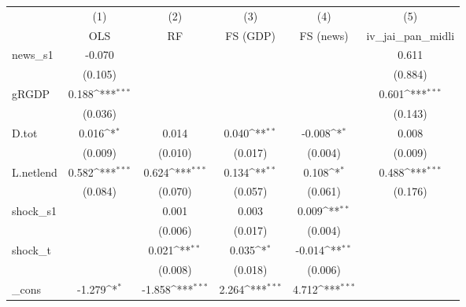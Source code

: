 {
\def\sym#1{\ifmmode^{#1}\else\(^{#1}\)\fi}
\begin{tabular}{l*{5}{c}}
\toprule
            &\multicolumn{1}{c}{(1)}&\multicolumn{1}{c}{(2)}&\multicolumn{1}{c}{(3)}&\multicolumn{1}{c}{(4)}&\multicolumn{1}{c}{(5)}\\
            &\multicolumn{1}{c}{OLS}&\multicolumn{1}{c}{RF}&\multicolumn{1}{c}{FS (GDP)}&\multicolumn{1}{c}{FS (news)}&\multicolumn{1}{c}{iv\_jai\_pan\_midli}\\
\midrule
news\_s1     &      -0.070         &                     &                     &                     &       0.611         \\
            &     (0.105)         &                     &                     &                     &     (0.884)         \\
\addlinespace
gRGDP       &       0.188\sym{***}&                     &                     &                     &       0.601\sym{***}\\
            &     (0.036)         &                     &                     &                     &     (0.143)         \\
\addlinespace
D.tot       &       0.016\sym{*}  &       0.014         &       0.040\sym{**} &      -0.008\sym{*}  &       0.008         \\
            &     (0.009)         &     (0.010)         &     (0.017)         &     (0.004)         &     (0.009)         \\
\addlinespace
L.netlend   &       0.582\sym{***}&       0.624\sym{***}&       0.134\sym{**} &       0.108\sym{*}  &       0.488\sym{***}\\
            &     (0.084)         &     (0.070)         &     (0.057)         &     (0.061)         &     (0.176)         \\
\addlinespace
shock\_s1    &                     &       0.001         &       0.003         &       0.009\sym{**} &                     \\
            &                     &     (0.006)         &     (0.017)         &     (0.004)         &                     \\
\addlinespace
shock\_t     &                     &       0.021\sym{**} &       0.035\sym{*}  &      -0.014\sym{**} &                     \\
            &                     &     (0.008)         &     (0.018)         &     (0.006)         &                     \\
\addlinespace
\_cons      &      -1.279\sym{*}  &      -1.858\sym{***}&       2.264\sym{***}&       4.712\sym{***}&                     \\

\end{tabular}}
